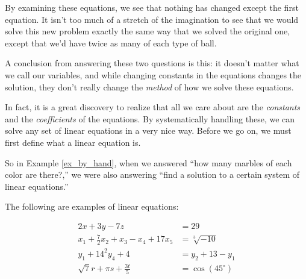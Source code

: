 By examining these equations, we see that nothing has changed except the first equation. It isn't too much of a stretch of the imagination to see that we would solve this new problem exactly the same way that we solved the original one, except that we'd have twice as many of each type of ball.



A conclusion from answering these two questions is this: it doesn't matter what we call our variables, and while changing constants in the equations changes the solution, they don't really change the {\em method} of how we solve these equations.

In fact, it is a great discovery to realize that all we care about are the {\em constants} and the {\em coefficients} of the equations. By systematically handling these, we can solve any set of linear equations in a very nice way. Before we go on, we must first define what a  linear equation is. 
\enlargethispage\baselineskip %


So in Example \ref{ex_by_hand}, when we answered ``how many marbles of each color are there?,'' we were also answering ``find a solution to a certain system of linear equations.''

The following are examples of linear equations:

\begin{align*}
2x+3y-7z&=29\\
x_1+\frac72x_2+x_3-x_4+17x_5&=\sqrt[3]{-10}\\
y_1+14^2y_4+4&=y_2+13-y_1\\
\sqrt{7}r+\pi s +\frac{3t}{5}&= \cos(45^\circ)
\end{align*}

